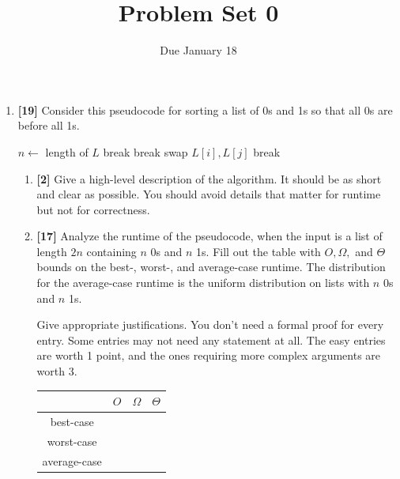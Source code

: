 \documentclass{article}
\title{Problem Set 0}
\date{Due January 18}
\begin{document}
\maketitle 

\begin{enumerate}

	\item{\bf [19]} Consider this pseudocode for sorting a list of 0s and 1s so that all 0s are before all 1s.

		\begin{algorithmic}
			\State $n\gets$ length of $L$
			\State break
			\EndIf
			\EndFor
			\State break
			\EndIf
			\EndFor
			\State swap $L[i],L[j]$
			\Else \State break
			\EndIf
			\EndWhile
		\end{algorithmic}

		\begin{enumerate}
			\item{\bf[2]} Give a high-level description of the algorithm. It should be as short and clear as possible. You should avoid details that matter for runtime but not for correctness.

			\item{\bf[17]} Analyze the runtime of the pseudocode, when the input is a list of length $2n$ containing $n$ 0s and $n$ 1s. Fill out the table with $O,\Omega,$ and $\Theta$ bounds on the best-, worst-, and average-case runtime. The distribution for the average-case runtime is the uniform distribution on lists with $n$ 0s and $n$ 1s. 

				Give appropriate justifications. You don't need a formal proof for every entry. Some entries may not need any statement at all. The easy entries are worth 1 point, and the ones requiring more complex arguments are worth 3.




		\begin{tabular}{|c|c|c|c|}
			\hline
			& $O$ & $\Omega$ & $\Theta$ \\ \hline
			best-case & \hspace{2cm} & \hspace{2cm} & \hspace{2cm} \\ \hline
			worst-case & & & \\ \hline
			average-case & & & \\ \hline
		\end{tabular}



\end{enumerate}
\end{enumerate}
\end{document}
